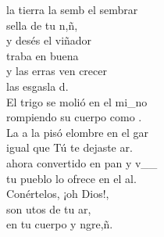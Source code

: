 \begin{cancion}[El sembrador][]%
	 la tierra la semb el sembrar \\
	 sella de tu n,ñ,  \\
	y desés el viñador \\
	traba en buena  \\
	y las erras ven crecer \\
	las esgasla d.\\
	El trigo se molió en el mi_no\\
	rompiendo su cuerpo como .\\
	La a la pisó elombre en el gar\\
	igual que Tú te dejaste ar.\\
	\jump
	ahora convertido en pan y v__\\
	tu pueblo lo ofrece en el al.\\
	Conértelos, ¡oh Dios!,\\
	son utos de tu ar,\\
	en tu cuerpo y ngre,ñ. \\
	\jump
\end{cancion}%
